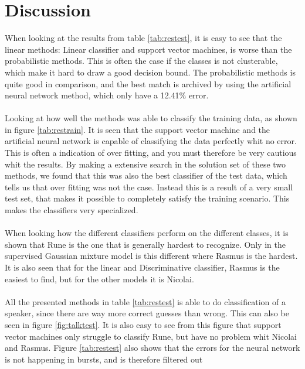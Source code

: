 \section{Discussion}
When looking at the results from table \ref{tab:restest}, it is easy to see that the linear methods: Linear classifier and support vector machines, is worse than the probabilistic methods. This is often the case if the classes is not clusterable, which make it hard to draw a good decision bound. The probabilistic methods is quite good in comparison, and the best match is archived by using the artificial neural network method, which only have a 12.41\% error. \\\ \\

Looking at how well the methods was able to classify the training data, as shown in figure \ref{tab:restrain}. It is seen that the support vector machine and the artificial neural network is capable of classifying the data perfectly whit no error. This is often a indication of over fitting, and you must therefore be very cautious whit the results. By making a extensive search in the solution set of these two methods, we found that this was also the best classifier of the test data, which tells us that over fitting was not the case. Instead this is a result of a very small test set, that makes it possible to completely satisfy the training scenario. This makes the classifiers very specialized. \\\ \\


When looking how the different classifiers perform on the different classes, it is shown that Rune is the one that is generally hardest to recognize. Only in the supervised Gaussian mixture model is this different where Rasmus is the hardest.  It is also seen that for the linear and Discriminative classifier, Rasmus is the easiest to find, but for the other models it is Nicolai. \\\ \\

All the presented methods in table \ref{tab:restest} is able to do classification of a speaker, since there are way more correct guesses than wrong. This can also be seen in figure \ref{fig:talktest}. It is also easy to see from this figure that support vector machines only struggle to classify Rune, but have no problem whit Nicolai and Rasmus. Figure \ref{tab:restest} also shows that the errors for the neural network is not happening in bursts, and is therefore filtered out \\\ \\

